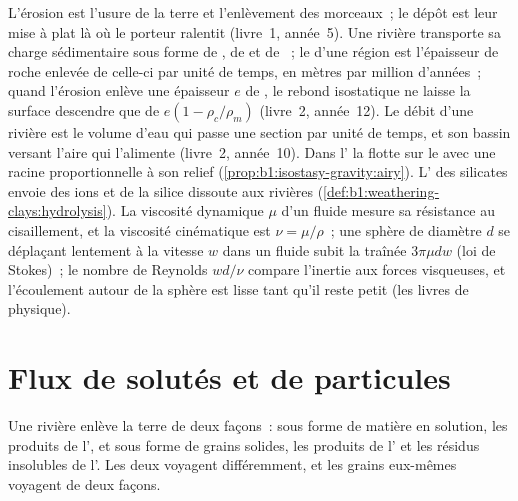 \begin{recall}
L'érosion est l'usure de la terre et l'enlèvement des morceaux~;
le dépôt est leur mise à plat là où le porteur ralentit (livre~1, année~5). Une
rivière transporte sa charge sédimentaire sous forme de , de  et de ~; le  d'une région est l'épaisseur de roche enlevée de
celle-ci par unité de temps, en mètres par million d'années~; quand l'érosion enlève une épaisseur
$e$ de , le rebond isostatique ne laisse la surface descendre que de
$e(1 - \rho_c/\rho_m)$ (livre~2, année~12). Le débit d'une rivière est le
volume d'eau qui passe une section par unité de temps, et son bassin versant
l'aire qui l'alimente (livre~2, année~10). Dans l' la 
flotte sur le  avec une racine proportionnelle à son relief
(\cref{prop:b1:isostasy-gravity:airy}). L' des silicates envoie des ions
et de la silice dissoute aux rivières (\cref{def:b1:weathering-clays:hydrolysis}).
La viscosité dynamique $\mu$ d'un fluide mesure sa résistance au cisaillement,
et la viscosité cinématique est $\nu = \mu/\rho$~; une sphère de diamètre $d$
se déplaçant lentement à la vitesse $w$ dans un fluide subit la traînée $3\pi\mu d w$
(loi de Stokes)~; le nombre de Reynolds $w d/\nu$ compare l'inertie aux forces
visqueuses, et l'écoulement autour de la sphère est lisse tant qu'il reste petit (les
livres de physique).
\end{recall}

\section{Flux de solutés et de particules}\label{sec:b1:erosion-transport:fluxes}

Une rivière enlève la terre de deux façons~: sous forme de matière en solution, les produits de
l', et sous forme de grains solides, les produits de l'
et les résidus insolubles de l'. Les deux voyagent différemment,
et les grains eux-mêmes voyagent de deux façons.

